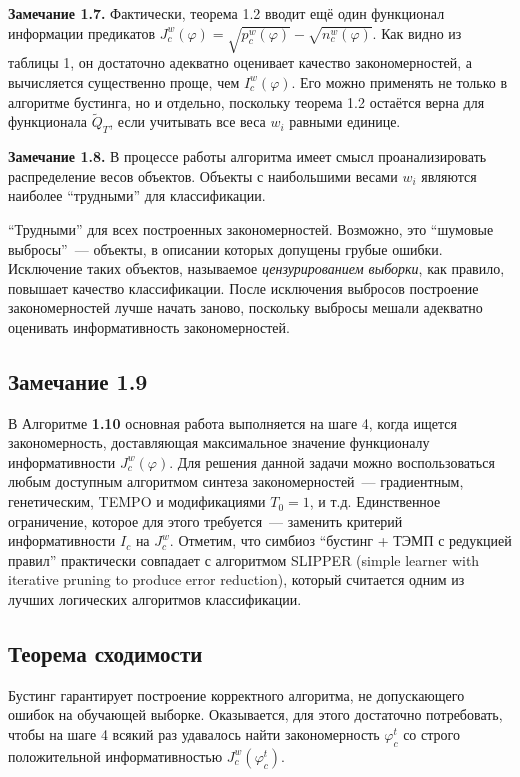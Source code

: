 \begin{itemize}
\textbf{Замечание 1.7.} Фактически, теорема 1.2 вводит ещё один функционал информации предикатов $J_c^w(\varphi) = \sqrt{p_c^w(\varphi)} - \sqrt{n_c^w(\varphi)}$. Как видно из таблицы 1, он достаточно адекватно оценивает качество закономерностей, а вычисляется существенно проще, чем $I_c^w(\varphi)$. Его можно применять не только в алгоритме бустинга, но и отдельно, поскольку теорема 1.2 остаётся верна для функционала $\tilde{Q}_T$, если учитывать все веса $w_i$ равными единице.

\textbf{Замечание 1.8.} В процессе работы алгоритма имеет смысл проанализировать распределение весов объектов. Объекты с наибольшими весами $w_i$ являются наиболее ``трудными'' для классификации.

``Трудными'' для всех построенных закономерностей. Возможно, это ``шумовые выбросы''~--- объекты, в описании которых допущены грубые ошибки. Исключение таких объектов, называемое \textit{цензурированием выборки}, как правило, повышает качество классификации. После исключения выбросов построение закономерностей лучше начать заново, поскольку выбросы мешали адекватно оценивать информативность закономерностей.

\subsection*{Замечание 1.9}
В Алгоритме \textbf{1.10} основная работа выполняется на шаге 4, когда ищется закономерность, доставляющая максимальное значение функционалу информативности $J_c^w(\varphi)$. Для решения данной задачи можно воспользоваться любым доступным алгоритмом синтеза закономерностей~--- градиентным, генетическим, TEMPO и модификациями $T_0 = 1$, и т.д. Единственное ограничение, которое для этого требуется~--- заменить критерий информативности $I_c$ на $J_c^w$. Отметим, что симбиоз ``бустинг + ТЭМП с редукцией правил'' практически совпадает с алгоритмом SLIPPER (simple learner with iterative pruning to produce error reduction), который считается одним из лучших логических алгоритмов классификации.

\subsection*{Теорема сходимости}
Бустинг гарантирует построение корректного алгоритма, не допускающего ошибок на обучающей выборке. Оказывается, для этого достаточно потребовать, чтобы на шаге 4 всякий раз удавалось найти закономерность $\varphi_c^t$ со строго положительной информативностью $J_c^w(\varphi_c^t)$.


\end{itemize}
